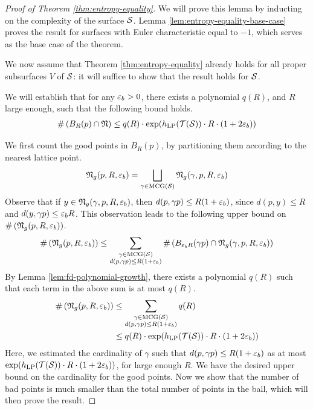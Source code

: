 \documentclass[12pt, reqno]{amsart}
\begin{document}
\begin{proof}[Proof of Theorem \ref{thm:entropy-equality}]
  We will prove this lemma by inducting on the complexity of the surface $\mathcal{S}$.
  Lemma \ref{lem:entropy-equality-base-case} proves the result for surfaces with Euler characteristic equal to $-1$, which serves as the base case of the theorem.

  We now assume that Theorem \ref{thm:entropy-equality} already holds for all proper subsurfaces $V$ of $\mathcal{S}$: it will suffice to show that the result holds for $\mathcal{S}$.

  We will establish that for any $\varepsilon_b > 0$, there exists a polynomial $q(R)$, and $R$ large enough, such that the following bound holds.
  \begin{align*}
    \#\left( B_R(p) \cap \mathfrak{N} \right) \leq q(R) \cdot \exp(h_{\mathrm{LP}}(\mathcal{T}(\mathcal{S})) \cdot R \cdot (1 + 2 \varepsilon_b))
  \end{align*}

  We first count the good points in $B_R(p)$, by partitioning them according to the nearest lattice point.
  \begin{align}
    \label{eq:good-point-partition}
    \mathfrak{N}_g(p, R, \varepsilon_b) = \bigsqcup_{\gamma \in \mathrm{MCG}(\mathcal{S})} \mathfrak{N}_g(\gamma, p, R, \varepsilon_b)
  \end{align}
  Observe that if $y \in \mathfrak{N}_g(\gamma, p, R, \varepsilon_b)$, then $d(p, \gamma p) \leq R(1 + \varepsilon_b)$, since $d(p, y) \leq R$ and $d(y, \gamma p) \leq \varepsilon_b R$.
  This observation leads to the following upper bound on $\#\left( \mathfrak{N}_g(p, R, \varepsilon_b) \right)$.
  \begin{align}
    \#\left( \mathfrak{N}_g(p, R, \varepsilon_b) \right) \leq \sum_{\substack{\gamma \in \mathrm{MCG}(\mathcal{S}) \\ d(p, \gamma p) \leq R(1 + \varepsilon_b)}} \#\left( B_{\varepsilon_b R}(\gamma p) \cap \mathfrak{N}_g(\gamma, p, R, \varepsilon_b)  \right) \label{eq:good-estimate-1}
  \end{align}
  By Lemma \ref{lem:fd-polynomial-growth}, there exists a polynomial $q(R)$ such that each term in the above sum is at most $q(R)$.
  \begin{align}
    \#\left( \mathfrak{N}_g(p, R, \varepsilon_b) \right) &\leq \sum_{\substack{\gamma \in \mathrm{MCG}(\mathcal{S}) \\ d(p, \gamma p) \leq R(1 + \varepsilon_b)}} q(R) \\
     &\leq q(R) \cdot \exp(h_{\mathrm{LP}}(\mathcal{T}(\mathcal{S})) \cdot R \cdot (1 + 2 \varepsilon_b))
    \label{eq:good-estimate-2}
  \end{align}
  Here, we estimated the cardinality of $\gamma$ such that $d(p, \gamma p) \leq R(1+\varepsilon_b)$ as at most $\exp(h_{\mathrm{LP}}(\mathcal{T}(\mathcal{S})) \cdot R \cdot (1 + 2 \varepsilon_b))$, for large enough $R$.
  We have the desired upper bound on the cardinality for the good points.
  Now we show that the number of bad points is much smaller than the total number of points in the ball, which will then prove the result.


\end{proof}
\end{document}
